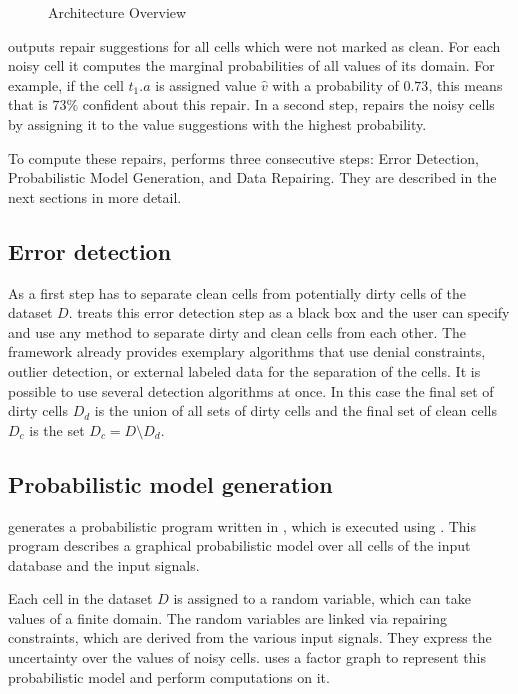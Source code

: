   \begin{figure}
    \centering
    
    \caption{\holoclean{} Architecture Overview}
    \label{fig:architecture}
  \end{figure}

  \holoclean{} outputs repair suggestions for all cells which were not marked as clean.
  For each noisy cell it computes the marginal probabilities of all values of its domain.
  For example, if the cell $t_1.a$ is assigned value $\hat{v}$ with a probability of $0.73$, this means that \holoclean{} is $73\%$ confident about this repair.
  In a second step, \holoclean{} repairs the noisy cells by assigning it to the value suggestions with the highest probability.
  
  To compute these repairs, \holoclean{} performs three consecutive steps: \textsf{Error Detection}, \textsf{Probabilistic Model Generation}, and \textsf{Data Repairing}.
  They are described in the next sections in more detail.
 
  \subsection{Error detection}
  As a first step \holoclean{} has to separate clean cells from potentially dirty cells of the dataset $D$.
  \holoclean{} treats this error detection step as a black box and the user can specify and use any method to separate dirty and clean cells from each other.
  The framework already provides exemplary algorithms that use denial constraints, outlier detection, or external labeled data for the separation of the cells.
  It is possible to use several detection algorithms at once.
  In this case the final set of dirty cells $D_d$ is the union of all sets of dirty cells and the final set of clean cells $D_c$ is the set $D_c = D \setminus D_d$.

  \subsection{Probabilistic model generation}
  \holoclean{} generates a probabilistic program written in \ddlog{}, which is executed using \deepdive{}.
  This program describes a graphical probabilistic model over all cells of the input database and the input signals.
  
  Each cell in the dataset $D$ is assigned to a random variable, which can take values of a finite domain.
  The random variables are linked via repairing constraints, which are derived from the various input signals.
  They express the uncertainty over the values of noisy cells.
  \holoclean{} uses a factor graph to represent this probabilistic model and perform computations on it.
  

